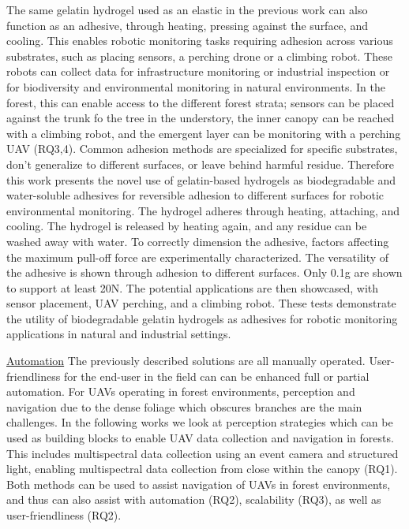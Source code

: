 The same gelatin hydrogel used as an elastic in the previous work can also function as an adhesive, through heating, pressing against the surface, and cooling. This enables robotic monitoring tasks requiring adhesion across various substrates, such as placing sensors, a perching drone or a climbing robot. These robots can collect data for infrastructure monitoring or industrial inspection or for biodiversity and environmental monitoring in natural environments. In the forest, this can enable access to the different forest strata; sensors can be placed against the trunk fo the tree in the understory, the inner canopy can be reached with a climbing robot, and the emergent layer can be monitoring with a perching UAV (RQ3,4).
Common adhesion methods are specialized for specific substrates, don't generalize to different surfaces, or leave behind harmful residue. Therefore this work presents the novel use of gelatin-based hydrogels as biodegradable and water-soluble adhesives for reversible adhesion to different surfaces for robotic environmental monitoring. The hydrogel adheres through heating, attaching, and cooling. The hydrogel is released by heating again, and any residue can be washed away with water. To correctly dimension the adhesive, factors affecting the maximum pull-off force are experimentally characterized. The versatility of the adhesive is shown through adhesion to different surfaces. Only 0.1g are shown to support at least 20N. The potential applications are then showcased, with sensor placement, UAV perching, and a climbing robot. These tests demonstrate the utility of biodegradable gelatin hydrogels as adhesives for robotic monitoring applications in natural and industrial settings.


\underline{Automation}
The previously described solutions are all manually operated. User-friendliness for the end-user in the field can can be enhanced full or partial automation. For UAVs operating in forest environments, perception and navigation due to the dense foliage which obscures branches are the main challenges. In the following works we look at perception strategies which can be used as building blocks to enable UAV data collection and navigation in forests. This includes multispectral data collection using an event camera and structured light, enabling multispectral data collection from close within the canopy (RQ1). Both methods can be used to assist navigation of UAVs in forest environments, and thus can also assist with automation (RQ2), scalability (RQ3), as well as user-friendliness (RQ2).

